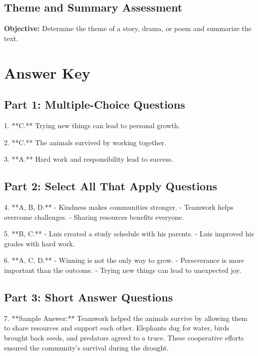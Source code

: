 \documentclass[12pt]{article}
\begin{document}
\subsection*{Theme and Summary Assessment}
\onehalfspacing

\begin{tcolorbox}[colframe=black!40, colback=gray!0, title=Learning Objective]
\textbf{Objective:} Determine the theme of a story, drama, or poem and summarize the text.
\end{tcolorbox}

\section*{Answer Key}

\subsection*{Part 1: Multiple-Choice Questions}

1. **C.** Trying new things can lead to personal growth.  

2. **C.** The animals survived by working together.  

3. **A.** Hard work and responsibility lead to success.  

\subsection*{Part 2: Select All That Apply Questions}

4. **A, B, D.**  
   - Kindness makes communities stronger.  
   - Teamwork helps overcome challenges.  
   - Sharing resources benefits everyone.  

5. **B, C.**  
   - Luis created a study schedule with his parents.  
   - Luis improved his grades with hard work.  

6. **A, C, D.**  
   - Winning is not the only way to grow.  
   - Perseverance is more important than the outcome.  
   - Trying new things can lead to unexpected joy.  

\subsection*{Part 3: Short Answer Questions}

7. **Sample Answer:** Teamwork helped the animals survive by allowing them to share resources and support each other. Elephants dug for water, birds brought back seeds, and predators agreed to a truce. These cooperative efforts ensured the community’s survival during the drought.  
\end{document}
